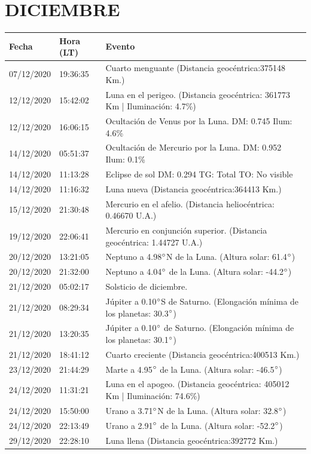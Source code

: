 \documentclass[12pt,a4paper,oneside]{article}
\begin{document}
\section{DICIEMBRE}
\begin{center}
\begin{tabular}{ |l| l| l| }
\hline
 \textbf{Fecha} & \textbf{Hora (LT)} & \textbf{Evento}\\
 \hline
07/12/2020 &  19:36:35   &  Cuarto menguante (Distancia geocéntrica:375148 Km.)	  \\
12/12/2020 &  15:42:02   &  Luna en el perigeo. (Distancia geocéntrica: 361773 Km | Iluminación: 4.7\%)	  \\
12/12/2020 &  16:06:15   &  Ocultación de Venus por la Luna. DM: 0.745 Ilum: 4.6\% 	  \\
14/12/2020 &  05:51:37   &  Ocultación de Mercurio por la Luna. DM: 0.952 Ilum: 0.1\% 	  \\
14/12/2020 &  11:13:28   &  Eclipse de sol DM: 0.294 TG: Total TO: No visible 	  \\
14/12/2020 &  11:16:32   &  Luna nueva (Distancia geocéntrica:364413 Km.)	  \\ 
15/12/2020 &  21:30:48   &  Mercurio en el afelio. (Distancia heliocéntrica: 0.46670 U.A.)	  \\
19/12/2020 &  22:06:41   &  Mercurio en conjunción superior. (Distancia geocéntrica: 1.44727 U.A.)	  \\
20/12/2020 &  13:21:05   &  Neptuno a 4.98$\degree$N de la Luna. (Altura solar: 61.4$\degree$)	  \\
20/12/2020 &  21:32:00   &  Neptuno a 4.04$\degree$ de la Luna. (Altura solar: -44.2$\degree$)	  \\
21/12/2020 &  05:02:17   &  Solsticio de diciembre.  \\
21/12/2020 &  08:29:34   &  Júpiter a 0.10$\degree$S de Saturno. (Elongación mínima de los planetas: 30.3$\degree$)	  \\
21/12/2020 &  13:20:35   &  Júpiter a 0.10$\degree$ de Saturno. (Elongación mínima de los planetas: 30.1$\degree$)	  \\
21/12/2020 &  18:41:12   &  Cuarto creciente (Distancia geocéntrica:400513 Km.)	  \\
23/12/2020 &  21:44:29   &  Marte a 4.95$\degree$ de la Luna. (Altura solar: -46.5$\degree$)	  \\
24/12/2020 &  11:31:21   &  Luna en el apogeo. (Distancia geocéntrica: 405012 Km | Iluminación: 74.6\%)	  \\
24/12/2020 &  15:50:00   &  Urano a 3.71$\degree$N de la Luna. (Altura solar: 32.8$\degree$)	  \\
24/12/2020 &  22:13:49   &  Urano a 2.91$\degree$ de la Luna. (Altura solar: -52.2$\degree$)	  \\
29/12/2020 &  22:28:10   &  Luna llena (Distancia geocéntrica:392772 Km.)	 \\
\hline
\end{tabular}
\end{center}
\end{document}

